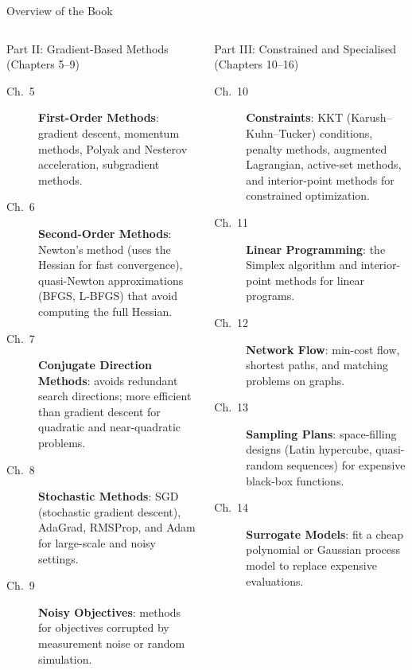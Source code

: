 \documentclass[aspectratio=169,10pt]{beamer}
\begin{document}
\begin{frame}[allowframebreaks]{Overview of the Book}
\begin{columns}[T]
      \begin{block}{Part II: Gradient-Based Methods (Chapters 5--9)}
        \begin{description}
          \item[Ch.\ 5] \textbf{First-Order Methods}: gradient descent, momentum
            methods, Polyak and Nesterov acceleration, subgradient methods.
          \item[Ch.\ 6] \textbf{Second-Order Methods}: Newton's method (uses the
            Hessian for fast convergence), quasi-Newton approximations (BFGS,
            L-BFGS) that avoid computing the full Hessian.
          \item[Ch.\ 7] \textbf{Conjugate Direction Methods}: avoids redundant
            search directions; more efficient than gradient descent for quadratic
            and near-quadratic problems.
          \item[Ch.\ 8] \textbf{Stochastic Methods}: SGD (stochastic gradient
            descent), AdaGrad, RMSProp, and Adam for large-scale and noisy settings.
          \item[Ch.\ 9] \textbf{Noisy Objectives}: methods for objectives
            corrupted by measurement noise or random simulation.
        \end{description}
      \end{block}

      \begin{block}{Part III: Constrained and Specialised (Chapters 10--16)}
        \begin{description}
          \item[Ch.\ 10] \textbf{Constraints}: KKT (Karush--Kuhn--Tucker)
            conditions, penalty methods, augmented Lagrangian, active-set methods,
            and interior-point methods for constrained optimization.
          \item[Ch.\ 11] \textbf{Linear Programming}: the Simplex algorithm
            and interior-point methods for linear programs.
          \item[Ch.\ 12] \textbf{Network Flow}: min-cost flow, shortest paths,
            and matching problems on graphs.
          \item[Ch.\ 13] \textbf{Sampling Plans}: space-filling designs (Latin
            hypercube, quasi-random sequences) for expensive black-box functions.
          \item[Ch.\ 14] \textbf{Surrogate Models}: fit a cheap polynomial or
            Gaussian process model to replace expensive evaluations.
        \end{description}
      \end{block}


\end{columns}
\end{frame}
\end{document}
